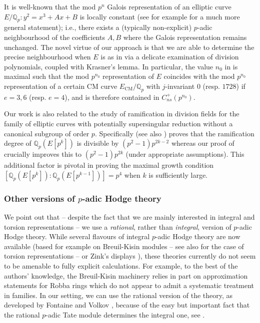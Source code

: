 \documentclass{amsart}
\newcommand{\Qp}{\mathbb{Q}_p}
\theoremstyle{definition}
\newcommand{\Q}{\mathbb{Q}}
\numberwithin{theorem}{section}
\numberwithin{equation}{section}
\begin{document}
It is well-known that the mod $p^n$ Galois representation of an elliptic curve $E/\Qp: y^2=x^3+Ax+B$ is locally constant (see for example \cite[Theorem~5.1(1)]{Kisin} for a much more general statement); i.e., there exists a (typically non-explicit) $p$-adic neighbourhood of the coefficients $A, B$ where the Galois representation remains unchanged. The novel virtue of our approach is that we are able to determine the precise neighbourhood when $E$ is as in  via a delicate examination of division polynomials, coupled with Krasner's lemma. In particular, the value $n_0$ in  is maximal such that the mod $p^{n_0}$ representation of $E$ coincides with the mod $p^{n_0}$ representation of a certain CM curve $E_{\textrm{CM}}/\Qp$ with $j$-invariant $0$ (resp. $1728$) if $e=3,6$ (resp. $e=4$), and is therefore contained in $C_{ns}^+(p^{n_0})$. 

Our work is also related to the study of ramification in division fields for the family of elliptic curves with potentially supersingular reduction without a canonical subgroup of order $p$. Specifically \cite[Theorem 1.1]{smith23} (see also \cite{MR3501021}) proves that the ramification degree of $\Q_p(E[p^k])$ is divisible by $(p^2-1)p^{2k-2}$ whereas our proof of  crucially improves this to $(p^2-1)p^{2k}$ (under appropriate assumptions). This additional factor is pivotal in proving the maximal growth condition $[\Q_p(E[p^{k}]) : \Q_p(E[p^{k-1}])] = p^4$ when $k$ is sufficiently large.


\subsubsection*{Other versions of $p$-adic Hodge theory}
We point out that -- despite the fact that we are mainly interested in integral and torsion representations -- we use a \textit{rational}, rather than \textit{integral}, version of $p$-adic Hodge theory. While several flavours of integral $p$-adic Hodge theory are now available (based for example on Breuil-Kisin modules \cite{MR1971512, MR2263197} -- see also \cite{MR2191528} for the case of torsion representations -- or Zink's displays \cite{MR1922825}), these theories currently do not seem to be amenable to fully explicit calculations. For example, to the best of the authors' knowledge, the Breuil-Kisin machinery relies in part on approximation statements for Robba rings which do not appear to admit a systematic treatment in families. In our setting, we can use the rational version of the theory, as developed by Fontaine \cite{Fontaine-p-divisible, Fontaine82, MR1293972} and Volkov \cite{Volkov}, because of the easy but important fact that the rational $p$-adic Tate module determines the integral one, see .
\end{document}
